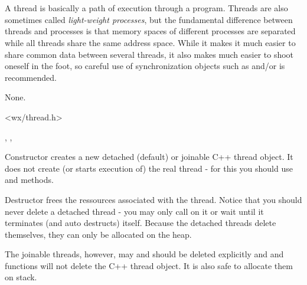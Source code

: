 \section{}\label{wxthread}

A thread is basically a path of execution through a program. Threads are also
sometimes called {\it light-weight processes}, but the fundamental difference
between threads and processes is that memory spaces of different processes are
separated while all threads share the same address space. While it makes it
much easier to share common data between several threads, it also makes much
easier to shoot oneself in the foot, so careful use of synchronization objects
such as  and/or  is recommended.


None.


<wx/thread.h>


, , 


\label{wxthreadctor}


Constructor creates a new detached (default) or joinable C++ thread object. It
does not create (or starts execution of) the real thread - for this you should
use  and  methods.



Destructor frees the ressources associated with the thread. Notice that you
should never delete a detached thread - you may only call 
 on it or wait until it terminates (and auto
destructs) itself. Because the detached threads delete themselves, they can
only be allocated on the heap.

The joinable threads, however, may and should be deleted explicitly and 
 and  functions
will not delete the C++ thread object. It is also safe to allocate them on
stack.


